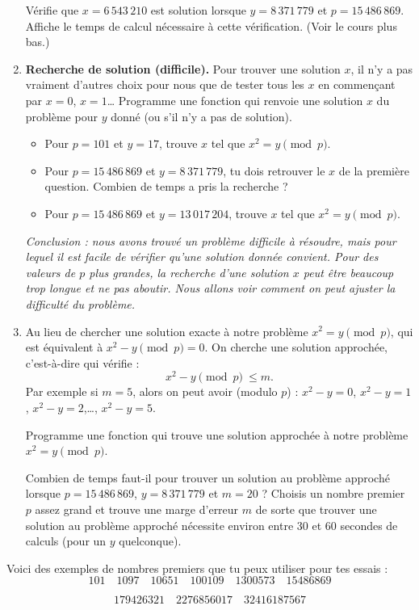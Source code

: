 \documentclass[11pt,class=report,crop=false]{standalone}
\begin{document}
\begin{activite}
\begin{enumerate}
  Vérifie que $x = 6\,543\,210$ est solution lorsque $y = 8\,371\,779$ et $p = 15\,486\,869$. Affiche le temps de calcul nécessaire à cette vérification. (Voir le cours plus bas.)
  
  \item \textbf{Recherche de solution (difficile).} Pour trouver une solution $x$, il n'y a pas vraiment d'autres choix pour nous que de tester tous les $x$ en commençant par $x=0$, $x=1$\ldots{}
Programme une fonction  qui renvoie une solution $x$ du problème pour $y$ donné (ou  s'il n'y a pas de solution).

  \begin{itemize}
    \item Pour $p = 101$ et $y=17$, trouve $x$ tel que $x^2 = y \pmod{p}$. 
    \item Pour $p = 15\,486\,869$ et $y = 8\,371\,779$, tu dois retrouver le $x$ de la première question. Combien de temps a pris la recherche ? 
    
    \item Pour $p = 15\,486\,869$ et $y = 13\,017\,204$, trouve $x$ tel que $x^2 = y \pmod{p}$.    
   \end{itemize}


\medskip

\emph{Conclusion : nous avons trouvé un problème difficile à résoudre, mais pour lequel il est facile de vérifier qu'une solution donnée convient. Pour des valeurs de $p$ plus grandes, la recherche d'une solution $x$ peut être beaucoup trop longue et ne pas aboutir. Nous allons voir comment on peut ajuster la difficulté du problème.}


	\item Au lieu de chercher une solution exacte à notre problème $x^2 = y \pmod{p}$, qui est équivalent à $x^2-y \pmod{p} = 0$. On cherche une solution approchée, c'est-à-dire qui vérifie : 	$$x^2 - y \pmod{p} \ \le m.$$
	Par exemple si $m=5$, alors on peut avoir (modulo $p$) : $x^2 - y = 0$, $x^2 - y = 1$,
	$x^2-y = 2$,\ldots, $x^2-y=5$. 
	
	Programme une fonction  qui trouve une solution approchée à notre problème $x^2 = y \pmod{p}$.
	
	Combien de temps faut-il pour trouver un solution au problème approché lorsque $p = 15\,486\,869$,  $y = 8\,371\,779$ et $m=20$ ?
	Choisis un nombre premier $p$ assez grand et trouve une marge d'erreur $m$ de sorte que trouver une solution au problème approché nécessite environ entre 30 et 60 secondes de calculs (pour un $y$ quelconque).

\end{enumerate}
  

Voici des exemples de nombres premiers que tu peux utiliser pour tes essais :
$$101 \quad
1097 \quad
10651 \quad
100109 \quad
1300573 \quad
15486869$$

$$179426321 \quad  
2276856017 \quad 
32416187567$$
\end{activite}
\end{document}
